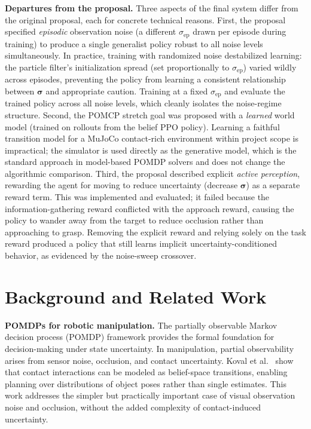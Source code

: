 \documentclass[conference]{IEEEtran}
\newcommand{\sigmaep}{\sigma_{\text{ep}}}
\begin{document}
\textbf{Departures from the proposal.}
Three aspects of the final system differ from the original proposal, each for
concrete technical reasons.
First, the proposal specified \emph{episodic} observation noise (a different
$\sigmaep$ drawn per episode during training) to produce a single generalist
policy robust to all noise levels simultaneously.
In practice, training with randomized noise destabilized learning: the particle
filter's initialization spread (set proportionally to $\sigmaep$) varied
wildly across episodes, preventing the policy from learning a consistent
relationship between $\bm{\sigma}$ and appropriate caution.
Training at a fixed $\sigmaep$ and evaluate the trained policy across
all noise levels, which cleanly isolates the noise-regime structure.
Second, the POMCP stretch goal was proposed with a \emph{learned} world model
(trained on rollouts from the belief PPO policy).
Learning a faithful transition model for a MuJoCo contact-rich environment
within project scope is impractical; the simulator is used directly
as the generative model, which is the standard approach in model-based POMDP
solvers and does not change the algorithmic comparison.
Third, the proposal described explicit \emph{active perception}, rewarding
the agent for moving to reduce uncertainty (decrease $\bm{\sigma}$) as a
separate reward term.
This was implemented and evaluated; it failed because the
information-gathering reward conflicted with the approach reward, causing the
policy to wander away from the target to reduce occlusion rather than
approaching to grasp.
Removing the explicit reward and relying solely on the task reward produced
a policy that still learns implicit uncertainty-conditioned behavior, as
evidenced by the noise-sweep crossover.

\section{Background and Related Work}
\label{sec:background}

\textbf{POMDPs for robotic manipulation.}
The partially observable Markov decision process (POMDP) framework
\cite{kaelbling1998pomdp} provides the formal foundation for decision-making
under state uncertainty.
In manipulation, partial observability arises from sensor noise, occlusion,
and contact uncertainty.
Koval et al.~\cite{koval2015manifold} show that contact interactions can be
modeled as belief-space transitions, enabling planning over distributions of
object poses rather than single estimates.
This work addresses the simpler but practically important case of visual
observation noise and occlusion, without the added complexity of contact-induced
uncertainty.
\end{document}
